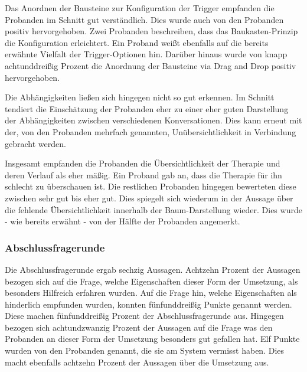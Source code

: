 Das Anordnen der Bausteine zur Konfiguration der Trigger empfanden die Probanden im Schnitt gut verständlich. Dies wurde auch von den Probanden positiv hervorgehoben. Zwei Probanden beschreiben, dass das Baukasten-Prinzip die Konfiguration erleichtert. Ein Proband weißt ebenfalls auf die bereits erwähnte Vielfalt der Trigger-Optionen hin. Darüber hinaus wurde von knapp achtunddreißig Prozent die Anordnung der Bausteine via Drag and Drop positiv hervorgehoben.

Die Abhängigkeiten ließen sich hingegen nicht so gut erkennen. Im Schnitt tendiert die Einschätzung der Probanden eher zu einer eher guten Darstellung der Abhängigkeiten zwischen verschiedenen Konversationen. Dies kann erneut mit der, von den Probanden mehrfach genannten, Unübersichtlichkeit in Verbindung gebracht werden. 

Insgesamt empfanden die Probanden die Übersichtlichkeit der Therapie und deren Verlauf als eher mäßig. Ein Proband gab an, dass die Therapie für ihn schlecht zu überschauen ist. Die restlichen Probanden hingegen bewerteten diese zwischen sehr gut bis eher gut. Dies spiegelt sich wiederum in der Aussage über die fehlende Übersichtlichkeit innerhalb der Baum-Darstellung wieder. Dies wurde - wie bereits erwähnt - von der Hälfte der Probanden angemerkt. 

\subsubsection{Abschlussfragerunde}
Die Abschlussfragerunde ergab sechzig Aussagen. Achtzehn Prozent der Aussagen bezogen sich auf die Frage, welche Eigenschaften dieser Form der Umsetzung, als besonders Hilfreich erfahren wurden. Auf die Frage hin, welche Eigenschaften als hinderlich empfunden wurden, konnten fünfunddreißig Punkte genannt werden. Diese machen fünfunddreißig Prozent der Abschlussfragerunde aus. Hingegen bezogen sich achtundzwanzig Prozent der Aussagen auf die Frage was den Probanden an dieser Form der Umsetzung besonders gut gefallen hat. Elf Punkte wurden von den Probanden genannt, die sie am System vermisst haben. Dies macht ebenfalls achtzehn Prozent der Aussagen über die Umsetzung aus. 

